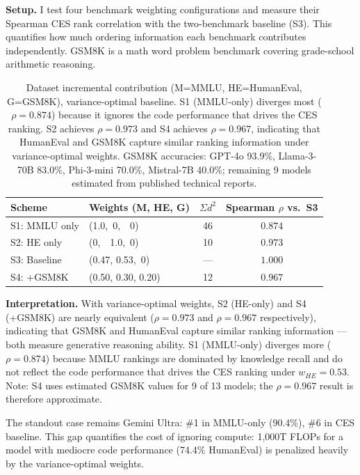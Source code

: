 \documentclass[12pt]{article}
\begin{document}
\textbf{Setup.} I test four benchmark weighting configurations and measure their Spearman CES rank correlation with the two-benchmark baseline (S3). This quantifies how much ordering information each benchmark contributes independently. GSM8K \cite{cobbe2021} is a math word problem benchmark covering grade-school arithmetic reasoning.

\begin{table}[H]
\centering
\begin{tabular}{llcc}
\toprule
\textbf{Scheme} & \textbf{Weights (M, HE, G)} & $\Sigma d^2$ & \textbf{Spearman} $\rho$ vs.\ S3 \\
\midrule
S1: MMLU only      & (1.0,\ 0,\ \ 0)    & 46  & $0.874$ \\
S2: HE only        & (0,\ \ 1.0,\ 0)    & 10  & $0.973$ \\
S3: Baseline       & (0.47, 0.53,\ 0)   & --- & $1.000$ \\
S4: +GSM8K         & (0.50, 0.30, 0.20) & 12  & $0.967$ \\
\bottomrule
\end{tabular}
\caption{Dataset incremental contribution (M=MMLU, HE=HumanEval, G=GSM8K), variance-optimal baseline.
S1 (MMLU-only) diverges most ($\rho=0.874$) because it ignores the code performance that drives the CES ranking. S2 achieves $\rho=0.973$ and S4 achieves $\rho=0.967$, indicating that HumanEval and GSM8K capture similar ranking information under variance-optimal weights.
GSM8K accuracies: GPT-4o 93.9\%, Llama-3-70B 83.0\%, Phi-3-mini 70.0\%, Mistral-7B 40.0\%; remaining 9 models estimated from published technical reports.}
\label{tab:exp3}
\end{table}

\textbf{Interpretation.} With variance-optimal weights, S2 (HE-only) and S4 (+GSM8K) are nearly equivalent ($\rho = 0.973$ and $\rho = 0.967$ respectively), indicating that GSM8K and HumanEval capture similar ranking information --- both measure generative reasoning ability. S1 (MMLU-only) diverges more ($\rho = 0.874$) because MMLU rankings are dominated by knowledge recall and do not reflect the code performance that drives the CES ranking under $w_{HE}=0.53$. Note: S4 uses estimated GSM8K values for 9 of 13 models; the $\rho=0.967$ result is therefore approximate.

The standout case remains Gemini Ultra: \#1 in MMLU-only (90.4\%), \#6 in CES baseline. This gap quantifies the cost of ignoring compute: 1,000T FLOPs for a model with mediocre code performance (74.4\% HumanEval) is penalized heavily by the variance-optimal weights.
\end{document}
